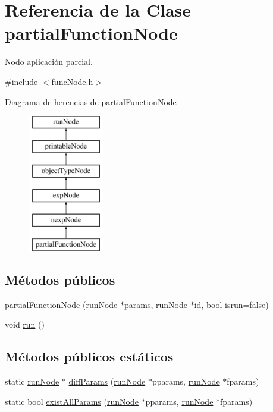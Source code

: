 \hypertarget{classpartialFunctionNode}{\section{Referencia de la Clase partial\-Function\-Node}
\label{classpartialFunctionNode}
}


Nodo aplicación parcial.  




{\ttfamily \#include $<$func\-Node.\-h$>$}

Diagrama de herencias de partial\-Function\-Node\begin{figure}[H]
\begin{center}
\leavevmode
\includegraphics[height=6.000000cm]{classpartialFunctionNode}
\end{center}
\end{figure}
\subsection*{Métodos públicos}
\begin{DoxyCompactItemize}
\item 
\hyperlink{classpartialFunctionNode_a403908a0e927bba828aabdb21e3b213f}{partial\-Function\-Node} (\hyperlink{classrunNode}{run\-Node} $\ast$params, \hyperlink{classrunNode}{run\-Node} $\ast$id, bool isrun=false)
\item 
void \hyperlink{classpartialFunctionNode_a02ef7f91a539de04d3ca4d05b53111f7}{run} ()
\end{DoxyCompactItemize}
\subsection*{Métodos públicos estáticos}
\begin{DoxyCompactItemize}
\item 
static \hyperlink{classrunNode}{run\-Node} $\ast$ \hyperlink{classpartialFunctionNode_a6ac68a2d60925dee64f8b237e66bc0a2}{diff\-Params} (\hyperlink{classrunNode}{run\-Node} $\ast$pparams, \hyperlink{classrunNode}{run\-Node} $\ast$fparams)
\item 
static bool \hyperlink{classpartialFunctionNode_a60ff4c3690cb9565faa881cbf80d05ff}{exist\-All\-Params} (\hyperlink{classrunNode}{run\-Node} $\ast$pparams, \hyperlink{classrunNode}{run\-Node} $\ast$fparams)
\end{DoxyCompactItemize}


